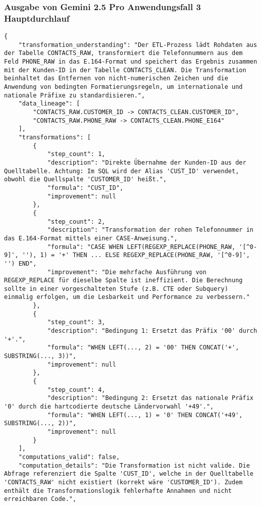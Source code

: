 \subsubsection{Ausgabe von Gemini 2.5 Pro Anwendungsfall 3 Hauptdurchlauf}\label{anhang:subsubsec:gemini_case3_prompt1}
\begin{lstlisting}[caption={Ausgabe: Gemini 2.5 Pro Anwendungsfall 3 Hauptdurchlauf},label={gemini_case3_prompt1}]
{
    "transformation_understanding": "Der ETL-Prozess lädt Rohdaten aus der Tabelle CONTACTS_RAW, transformiert die Telefonnummern aus dem Feld PHONE_RAW in das E.164-Format und speichert das Ergebnis zusammen mit der Kunden-ID in der Tabelle CONTACTS_CLEAN. Die Transformation beinhaltet das Entfernen von nicht-numerischen Zeichen und die Anwendung von bedingten Formatierungsregeln, um internationale und nationale Präfixe zu standardisieren.",
    "data_lineage": [
        "CONTACTS_RAW.CUSTOMER_ID -> CONTACTS_CLEAN.CUSTOMER_ID",
        "CONTACTS_RAW.PHONE_RAW -> CONTACTS_CLEAN.PHONE_E164"
    ],
    "transformations": [
        {
            "step_count": 1,
            "description": "Direkte Übernahme der Kunden-ID aus der Quelltabelle. Achtung: Im SQL wird der Alias 'CUST_ID' verwendet, obwohl die Quellspalte 'CUSTOMER_ID' heißt.",
            "formula": "CUST_ID",
            "improvement": null
        },
        {
            "step_count": 2,
            "description": "Transformation der rohen Telefonnummer in das E.164-Format mittels einer CASE-Anweisung.",
            "formula": "CASE WHEN LEFT(REGEXP_REPLACE(PHONE_RAW, '[^0-9]', ''), 1) = '+' THEN ... ELSE REGEXP_REPLACE(PHONE_RAW, '[^0-9]', '') END",
            "improvement": "Die mehrfache Ausführung von REGEXP_REPLACE für dieselbe Spalte ist ineffizient. Die Berechnung sollte in einer vorgeschalteten Stufe (z.B. CTE oder Subquery) einmalig erfolgen, um die Lesbarkeit und Performance zu verbessern."
        },
        {
            "step_count": 3,
            "description": "Bedingung 1: Ersetzt das Präfix '00' durch '+'.",
            "formula": "WHEN LEFT(..., 2) = '00' THEN CONCAT('+', SUBSTRING(..., 3))",
            "improvement": null
        },
        {
            "step_count": 4,
            "description": "Bedingung 2: Ersetzt das nationale Präfix '0' durch die hartcodierte deutsche Ländervorwahl '+49'.",
            "formula": "WHEN LEFT(..., 1) = '0' THEN CONCAT('+49', SUBSTRING(..., 2))",
            "improvement": null
        }
    ],
    "computations_valid": false,
    "computation_details": "Die Transformation ist nicht valide. Die Abfrage referenziert die Spalte 'CUST_ID', welche in der Quelltabelle 'CONTACTS_RAW' nicht existiert (korrekt wäre 'CUSTOMER_ID'). Zudem enthält die Transformationslogik fehlerhafte Annahmen und nicht erreichbaren Code.",

\end{lstlisting}
